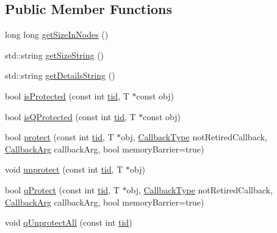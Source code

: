 \subsection*{Public Member Functions}
\begin{DoxyCompactItemize}
\item 
long long \hyperlink{classreclaimer__interface_aff9a466872ab7972a27e817c7d776936}{get\+Size\+In\+Nodes} ()
\item 
std\+::string \hyperlink{classreclaimer__interface_a949bf6cedb35e2bb0b853b0b7ef7b03e}{get\+Size\+String} ()
\item 
std\+::string \hyperlink{classreclaimer__interface_ada48535c0c82904eb0bbe3491e52eca7}{get\+Details\+String} ()
\item 
bool \hyperlink{classreclaimer__interface_ad459569f628d48ad8f953de155277937}{is\+Protected} (const int \hyperlink{microbench_2main_8cpp_a9ca9869868fe7e7a38a921cc7de4103f}{tid}, T $\ast$const obj)
\item 
bool \hyperlink{classreclaimer__interface_adca271430185d90a3a1c7aea22d8bb0c}{is\+Q\+Protected} (const int \hyperlink{microbench_2main_8cpp_a9ca9869868fe7e7a38a921cc7de4103f}{tid}, T $\ast$const obj)
\item 
bool \hyperlink{classreclaimer__interface_acdac11080a38f7d5b6e60007d9b620cf}{protect} (const int \hyperlink{microbench_2main_8cpp_a9ca9869868fe7e7a38a921cc7de4103f}{tid}, T $\ast$obj, \hyperlink{globals_8h_a57f5c0d40b156d7d996492fb2f16e3cd}{Callback\+Type} not\+Retired\+Callback, \hyperlink{globals_8h_a3de64ef48066ac6430631c8b81a15345}{Callback\+Arg} callback\+Arg, bool memory\+Barrier=true)
\item 
void \hyperlink{classreclaimer__interface_acdeb54332a2edeee70ee37581017ec0b}{unprotect} (const int \hyperlink{microbench_2main_8cpp_a9ca9869868fe7e7a38a921cc7de4103f}{tid}, T $\ast$obj)
\item 
bool \hyperlink{classreclaimer__interface_ae017ea119e3bc36949107124babf3888}{q\+Protect} (const int \hyperlink{microbench_2main_8cpp_a9ca9869868fe7e7a38a921cc7de4103f}{tid}, T $\ast$obj, \hyperlink{globals_8h_a57f5c0d40b156d7d996492fb2f16e3cd}{Callback\+Type} not\+Retired\+Callback, \hyperlink{globals_8h_a3de64ef48066ac6430631c8b81a15345}{Callback\+Arg} callback\+Arg, bool memory\+Barrier=true)
\item 
void \hyperlink{classreclaimer__interface_a0893dc3706f43bfeb5572808bba6b92a}{q\+Unprotect\+All} (const int \hyperlink{microbench_2main_8cpp_a9ca9869868fe7e7a38a921cc7de4103f}{tid})
\item 

\end{DoxyCompactItemize}
